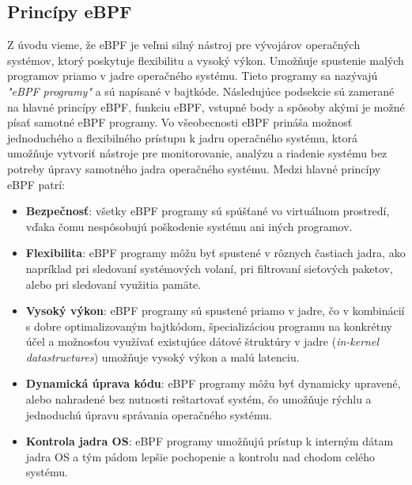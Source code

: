 \subsection{Princípy eBPF}
Z úvodu vieme, že eBPF je veľmi silný nástroj pre vývojárov operačných systémov, ktorý poskytuje flexibilitu a vysoký výkon. 
Umožňuje spustenie malých programov priamo v jadre operačného systému. Tieto programy sa nazývajú \emph{"eBPF programy"} a sú napísané v bajtkóde. 
Následujúce podsekcie sú zamerané na hlavné princípy eBPF, funkciu eBPF, vstupné body a spôsoby akými je možné písať samotné eBPF programy. 
Vo všeobecnosti eBPF prináša možnosť jednoduchého a flexibilného prístupu k jadru operačného systému, ktorá umožňuje vytvoriť nástroje pre monitorovanie, 
analýzu a riadenie systému bez potreby úpravy samotného jadra operačného systému. 
Medzi hlavné princípy eBPF patrí: 
\begin{itemize}
    \item \textbf{Bezpečnosť}: všetky eBPF programy sú spúšťané vo virtuálnom prostredí, vďaka čomu nespôsobujú poškodenie systému ani iných programov.
    \item \textbf{Flexibilita}: eBPF programy môžu byť spustené v rôznych častiach jadra, ako napríklad pri sledovaní systémových volaní, 
    pri filtrovaní sieťových paketov, alebo  pri sledovaní využitia pamäte.
    \item \textbf{Vysoký výkon}: eBPF programy sú spustené priamo v jadre, čo v kombinácií s dobre optimalizovaným bajtkódom, 
    špecializáciou programu na konkrétny účel a možnosťou využívať existujúce dátové štruktúry v jadre (\emph{in-kernel datastructures})  
    umožňuje vysoký výkon a malú latenciu.
    \item \textbf{Dynamická úprava kódu}: eBPF programy môžu byť dynamicky upravené, alebo nahradené bez nutnosti reštartovať systém, 
    čo umožňuje rýchlu a jednoduchú úpravu správania operačného systému.
    \item \textbf{Kontrola jadra OS}: eBPF programy umožňujú prístup k interným dátam jadra OS a tým pádom lepšie pochopenie a kontrolu 
    nad chodom celého systému.
\end{itemize}

